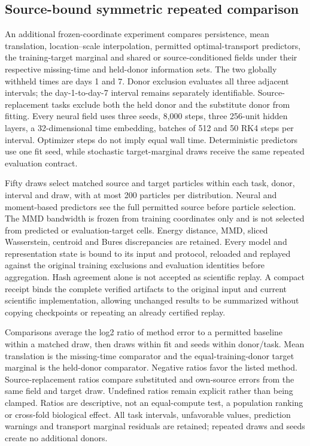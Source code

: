 \documentclass[10pt,a4paper]{article}
\begin{document}
\subsection{Source-bound symmetric repeated comparison}
An additional frozen-coordinate experiment compares persistence, mean translation, location--scale interpolation, permitted optimal-transport predictors, the training-target marginal and shared or source-conditioned fields under their respective missing-time and held-donor information sets. The two globally withheld times are days 1 and 7. Donor exclusion evaluates all three adjacent intervals; the day-1-to-day-7 interval remains separately identifiable. Source-replacement tasks exclude both the held donor and the substitute donor from fitting. Every neural field uses three seeds, 8,000 steps, three 256-unit hidden layers, a 32-dimensional time embedding, batches of 512 and 50 RK4 steps per interval. Optimizer steps do not imply equal wall time. Deterministic predictors use one fit seed, while stochastic target-marginal draws receive the same repeated evaluation contract.

Fifty draws select matched source and target particles within each task, donor, interval and draw, with at most 200 particles per distribution. Neural and moment-based predictors see the full permitted source before particle selection. The MMD bandwidth is frozen from training coordinates only and is not selected from predicted or evaluation-target cells. Energy distance, MMD, sliced Wasserstein, centroid and Bures discrepancies are retained. Every model and representation state is bound to its input and protocol, reloaded and replayed against the original training exclusions and evaluation identities before aggregation. Hash agreement alone is not accepted as scientific replay. A compact receipt binds the complete verified artifacts to the original input and current scientific implementation, allowing unchanged results to be summarized without copying checkpoints or repeating an already certified replay.

Comparisons average the log2 ratio of method error to a permitted baseline within a matched draw, then draws within fit and seeds within donor/task. Mean translation is the missing-time comparator and the equal-training-donor target marginal is the held-donor comparator. Negative ratios favor the listed method. Source-replacement ratios compare substituted and own-source errors from the same field and target draw. Undefined ratios remain explicit rather than being clamped. Ratios are descriptive, not an equal-compute test, a population ranking or cross-fold biological effect. All task intervals, unfavorable values, prediction warnings and transport marginal residuals are retained; repeated draws and seeds create no additional donors.
\end{document}
